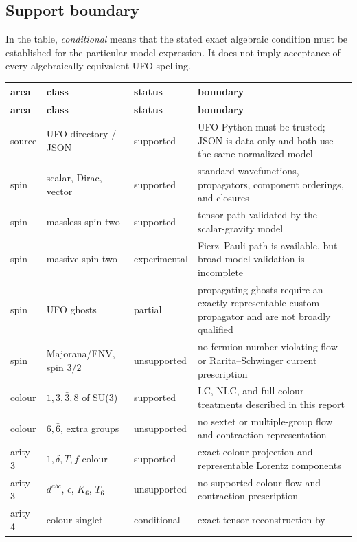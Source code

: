 \subsection{Support boundary}

In the table, \emph{conditional} means that the stated exact algebraic
condition must be established for the particular model expression. It does not
imply acceptance of every algebraically equivalent UFO spelling.

\begingroup
\small
\setlength{\LTpre}{0.3em}
\setlength{\LTpost}{0.3em}
\begin{longtable}{@{}L{0.83in}L{1.47in}L{0.93in}L{3.15in}@{}}
\toprule
\textbf{area} & \textbf{class} & \textbf{status} & \textbf{boundary} \\
\midrule
\endfirsthead
\toprule
\textbf{area} & \textbf{class} & \textbf{status} & \textbf{boundary} \\
\midrule
\endhead
source & UFO directory / JSON & supported & UFO Python must be trusted; JSON
  is data-only and both use the same normalized model \\
spin & scalar, Dirac, vector & supported & standard wavefunctions,
  propagators, component orderings, and closures \\
spin & massless spin two & supported & tensor path validated by the
  scalar-gravity model \\
spin & massive spin two & experimental & Fierz--Pauli path is available, but
  broad model validation is incomplete \\
spin & UFO ghosts & partial & propagating ghosts require an exactly
  representable custom propagator and are not broadly qualified \\
spin & Majorana/FNV, spin \(3/2\) & unsupported & no
  fermion-number-violating-flow or Rarita--Schwinger current prescription \\
colour & \(1,3,\bar3,8\) of SU(3) & supported & LC, NLC, and full-colour
  treatments described in this report \\
colour & \(6,\bar6\), extra groups & unsupported & no sextet or
  multiple-group flow and contraction representation \\
arity 3 & \(1,\delta,T,f\) colour & supported & exact colour projection and
  representable Lorentz components \\
arity 3 & \(d^{abc}\), \(\epsilon\), \(K_6\), \(T_6\) & unsupported & no
  supported colour-flow and contraction prescription \\
arity 4 & colour singlet & conditional & exact tensor reconstruction by

\end{longtable}
